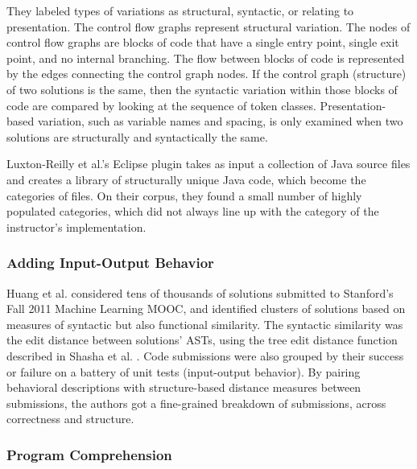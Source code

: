 \documentclass[12pt]{article}
\begin{document}
They labeled types of variations as structural, syntactic, or relating to presentation. The control flow graphs represent structural variation. The nodes of control flow graphs are blocks of code that have a single entry point, single exit point, and no internal branching. The flow between blocks of code is represented by the edges connecting the control graph nodes. If the control graph (structure) of two solutions is the same, then the syntactic variation within those blocks of code are compared by looking at the sequence of token classes. Presentation-based variation, such as variable names and spacing, is only examined when two solutions are structurally and syntactically the same.

Luxton-Reilly et al.'s Eclipse plugin takes as input a collection of Java source files and creates a library of structurally unique Java code, which become the categories of files. On their corpus, they found a small number of highly populated categories, which did not always line up with the category of the instructor's implementation.

\subsubsection{Adding Input-Output Behavior}

Huang et al. \cite{MOOCshop} considered tens of thousands of solutions submitted to Stanford's Fall 2011 Machine Learning MOOC, and identified clusters of solutions based on measures of syntactic but also functional similarity. The syntactic similarity was the edit distance between solutions' ASTs, using the tree edit distance function described in Shasha et al. \cite{shasha1994exact}. Code submissions were also grouped by their success or failure on a battery of unit tests (input-output behavior). By pairing behavioral descriptions with structure-based distance measures between submissions, the authors got a fine-grained breakdown of submissions, across correctness and structure.

\subsubsection{Program Comprehension}
\end{document}
